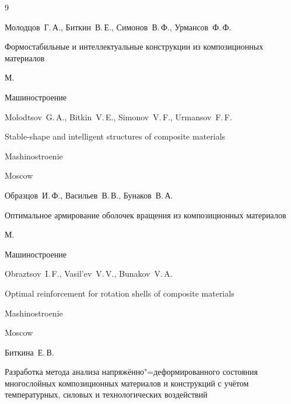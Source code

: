 \begin{thebibliography}{9}




\by Молодцов~Г.\,А., Биткин~В.\,Е., Симонов~В.\,Ф., Урмансов~Ф.\,Ф.

\book Формостабильные и интеллектуальные конструкции из композиционных материалов

\publaddr М.

\publ Машиностроение



\misctransl

\by Molodtsov~G.\,A., Bitkin~V.\,E., Simonov~V.\,F., Urmansov~F.\,F.

\book Stable-shape and intelligent structures of composite materials 

\publ Mashinostroenie

\publaddr Moscow






\by Образцов~И.\,Ф., Васильев~В.\,В., Бунаков~В.\,А.

\book Оптимальное армирование оболочек вращения из композиционных материалов

\publaddr М.

\publ Машиностроение



\misctransl

\by Obraztsov~I.\,F., Vasil'ev~V.\,V., Bunakov~V.\,A. 

\book Optimal reinforcement for  rotation shells of composite materials 

\publ Mashinostroenie

\publaddr Moscow






\by Биткина~Е.\,В.

\thesis Разработка метода анализа напряжённо"=деформированного состояния многослойных композиционных материалов и конструкций с учётом температурных, силовых и технологических воздействий


\end{thebibliography}
